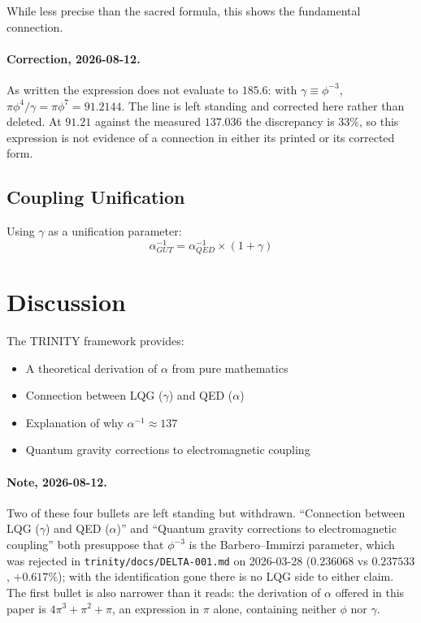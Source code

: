 \documentclass[12pt,a4paper]{article}
\begin{document}
While less precise than the sacred formula, this shows the fundamental connection.

\paragraph{Correction, 2026-08-12.} As written the expression does not evaluate to $185.6$: with $\gamma \equiv \phi^{-3}$, $\pi\phi^4/\gamma = \pi\phi^7 = 91.2144$. The line is left standing and corrected here rather than deleted. At $91.21$ against the measured $137.036$ the discrepancy is $33\%$, so this expression is not evidence of a connection in either its printed or its corrected form.

\subsection{Coupling Unification}

Using $\gamma$ as a unification parameter:
\begin{equation}
\alpha_{GUT}^{-1} = \alpha_{QED}^{-1} \times (1 + \gamma)
\end{equation}

\section{Discussion}

The TRINITY framework provides:
\begin{itemize}
\item A theoretical derivation of $\alpha$ from pure mathematics
\item Connection between LQG ($\gamma$) and QED ($\alpha$)
\item Explanation of why $\alpha^{-1} \approx 137$
\item Quantum gravity corrections to electromagnetic coupling
\end{itemize}

\paragraph{Note, 2026-08-12.} Two of these four bullets are left standing but withdrawn. ``Connection between LQG ($\gamma$) and QED ($\alpha$)'' and ``Quantum gravity corrections to electromagnetic coupling'' both presuppose that $\phi^{-3}$ is the Barbero--Immirzi parameter, which was rejected in \texttt{trinity/docs/DELTA-001.md} on 2026-03-28 ($0.236068$ vs $0.237533$, $+0.617\%$); with the identification gone there is no LQG side to either claim. The first bullet is also narrower than it reads: the derivation of $\alpha$ offered in this paper is $4\pi^3 + \pi^2 + \pi$, an expression in $\pi$ alone, containing neither $\phi$ nor $\gamma$.
\end{document}
